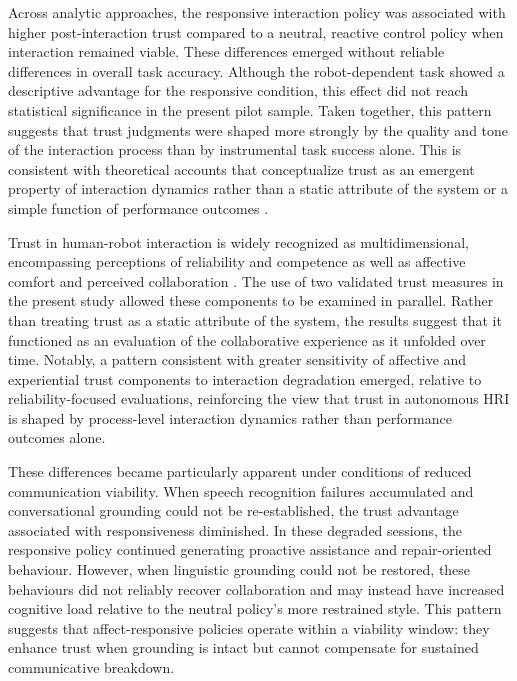 \documentclass[
]{article}
\begin{document}
Across analytic approaches, the responsive interaction policy was
associated with higher post-interaction trust compared to a neutral,
reactive control policy when interaction remained viable. These
differences emerged without reliable differences in overall task
accuracy. Although the robot-dependent task showed a descriptive
advantage for the responsive condition, this effect did not reach
statistical significance in the present pilot sample. Taken together,
this pattern suggests that trust judgments were shaped more strongly by
the quality and tone of the interaction process than by instrumental
task success alone. This is consistent with theoretical accounts that
conceptualize trust as an emergent property of interaction dynamics
rather than a static attribute of the system or a simple function of
performance outcomes \autocite{lee2004,devisser2020}.

Trust in human-robot interaction is widely recognized as
multidimensional, encompassing perceptions of reliability and competence
as well as affective comfort and perceived collaboration
\autocite{lee2004,devisser2020}. The use of two validated trust measures
in the present study allowed these components to be examined in
parallel. Rather than treating trust as a static attribute of the
system, the results suggest that it functioned as an evaluation of the
collaborative experience as it unfolded over time. Notably, a pattern
consistent with greater sensitivity of affective and experiential trust
components to interaction degradation emerged, relative to
reliability-focused evaluations, reinforcing the view that trust in
autonomous HRI is shaped by process-level interaction dynamics rather
than performance outcomes alone.

These differences became particularly apparent under conditions of
reduced communication viability. When speech recognition failures
accumulated and conversational grounding could not be re-established,
the trust advantage associated with responsiveness diminished. In these
degraded sessions, the responsive policy continued generating proactive
assistance and repair-oriented behaviour. However, when linguistic
grounding could not be restored, these behaviours did not reliably
recover collaboration and may instead have increased cognitive load
relative to the neutral policy's more restrained style. This pattern
suggests that affect-responsive policies operate within a viability
window: they enhance trust when grounding is intact but cannot
compensate for sustained communicative breakdown.
\end{document}
